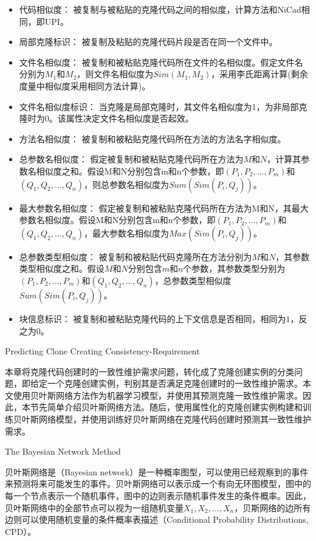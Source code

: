 \begin{itemize}
\item
代码相似度：
被复制与被粘贴的克隆代码之间的相似度，计算方法和NiCad相同，即UPI\cite{roy2008nicad}。
\item
局部克隆标识：
被复制及粘贴的克隆代码片段是否在同一个文件中。
\item
文件名相似度：
被复制和被粘贴克隆代码所在文件的名相似度。假定文件名分别为$M_1$和$M_2$，则文件名相似度为$Sim(M_1,M_2)$，采用李氏距离\cite{levenshtein1966binary}计算(剩余度量中相似度采用相同方法计算)。
\item
文件名相似度标识：
当克隆是局部克隆时，其文件名相似度为1，为非局部克隆时为0。该属性决定文件名相似度是否起效。
\item
方法名相似度：
被复制和被粘贴克隆代码所在方法的方法名字相似度。
\item
总参数名相似度：
假定被复制和被粘贴克隆代码所在方法为$M$和$N$，计算其参数名相似度之和。假设M和N分别包含m和n个参数，即$(P_1,P_2,…,P_m)$和$(Q_1,Q_2,…,Q_n)$，则总参数名相似度为$Sum(Sim(P_i,Q_j))$。
\item
最大参数名相似度：
假定被复制和被粘贴克隆代码所在方法为M和N，其最大参数名相似度。假设M和N分别包含m和n个参数，即$(P_1,P_2,…,P_m)$和$(Q_1,Q_2,…,Q_n)$，最大参数名相似度为$Max(Sim(P_i,Q_j))$。
\item 
总参数类型相似度：
被复制和被粘贴代码克隆所在方法分别为$M$和$N$，其参数类型相似度之和。假设$M$和$N$分别包含$m$和$n$个参数，其参数类型分别为$(P_1,P_2,…,P_m)$和$(Q_1,Q_2,…,Q_n)$，总参数类型相似度$Sum(Sim(P_i,Q_j))$。
\item
块信息标识：
被复制和被粘贴克隆代码的上下文信息是否相同，相同为$1$，反之为$0$。
\end{itemize}



{Predicting Clone Creating Consistency-Requirement}

本章将克隆代码创建时的一致性维护需求问题，转化成了克隆创建实例的分类问题，即给定一个克隆创建实例，判别其是否满足克隆创建时的一致性维护需求。本文使用贝叶斯网络方法作为机器学习模型，并使用其预测克隆一致性维护需求。因此，本节先简单介绍贝叶斯网络方法。随后，使用属性化的克隆创建实例构建和训练贝叶斯网络模型，并使用训练好贝叶斯网络在克隆代码创建时预测其一致性维护需求。

{The Bayesian Network Method}
\label{lab-bayes}

贝叶斯网络是（Bayesian network）是一种概率图型，可以使用已经观察到的事件来预测将来可能发生的事件\cite{friedman1997bayesian}。贝叶斯网络可以表示成一个有向无环图模型，图中的每一个节点表示一个随机事件，图中的边则表示随机事件发生的条件概率。因此， 贝叶斯网络中的全部节点可以视为一组随机变量{$X_{1},X_{2},...,X_{n}$}，贝斯网络的边所有边则可以使用随机变量的条件概率表描述（Conditional Probability Distributions, CPD）。

